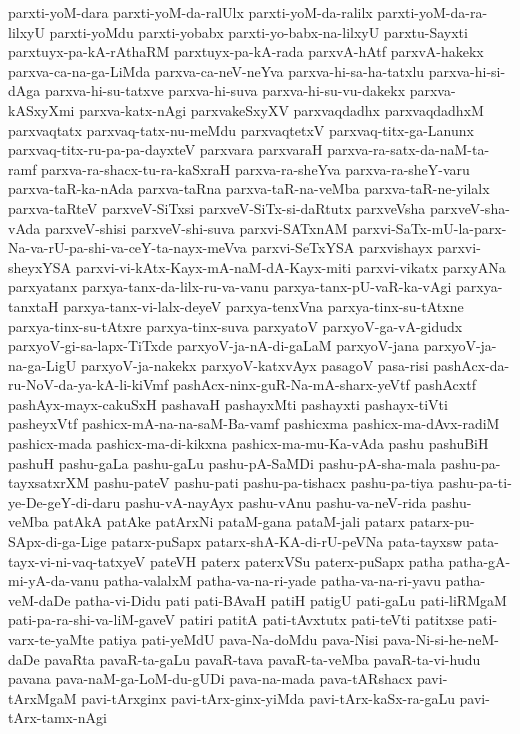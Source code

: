 {parxti-yoM-dara
parxti-yoM-da-ralUlx
parxti-yoM-da-ralilx
parxti-yoM-da-ra-lilxyU
parxti-yoMdu
parxti-yobabx
parxti-yo-babx-na-lilxyU
parxtu-Sayxti
parxtuyx-pa-kA-rAthaRM
parxtuyx-pa-kA-rada
parxvA-hAtf
parxvA-hakekx
parxva-ca-na-ga-LiMda
parxva-ca-neV-neYva
parxva-hi-sa-ha-tatxlu
parxva-hi-si-dAga
parxva-hi-su-tatxve
parxva-hi-suva
parxva-hi-su-vu-dakekx
parxva-kASxyXmi
parxva-katx-nAgi
parxvakeSxyXV
parxvaqdadhx
parxvaqdadhxM
parxvaqtatx
parxvaq-tatx-nu-meMdu
parxvaqtetxV
parxvaq-titx-ga-Lanunx
parxvaq-titx-ru-pa-pa-dayxteV
parxvara
parxvaraH
parxva-ra-satx-da-naM-ta-ramf
parxva-ra-shacx-tu-ra-kaSxraH
parxva-ra-sheYva
parxva-ra-sheY-varu
parxva-taR-ka-nAda
parxva-taRna
parxva-taR-na-veMba
parxva-taR-ne-yilalx
parxva-taRteV
parxveV-SiTxsi
parxveV-SiTx-si-daRtutx
parxveVsha
parxveV-sha-vAda
parxveV-shisi
parxveV-shi-suva
parxvi-SATxnAM
parxvi-SaTx-mU-la-parx-Na-va-rU-pa-shi-va-ceY-ta-nayx-meVva
parxvi-SeTxYSA
parxvishayx
parxvi-sheyxYSA
parxvi-vi-kAtx-Kayx-mA-naM-dA-Kayx-miti
parxvi-vikatx
parxyANa
parxyatanx
parxya-tanx-da-lilx-ru-va-vanu
parxya-tanx-pU-vaR-ka-vAgi
parxya-tanxtaH
parxya-tanx-vi-lalx-deyeV
parxya-tenxVna
parxya-tinx-su-tAtxne
parxya-tinx-su-tAtxre
parxya-tinx-suva
parxyatoV
parxyoV-ga-vA-gidudx
parxyoV-gi-sa-lapx-TiTxde
parxyoV-ja-nA-di-gaLaM
parxyoV-jana
parxyoV-ja-na-ga-LigU
parxyoV-ja-nakekx
parxyoV-katxvAyx
pasagoV
pasa-risi
pashAcx-da-ru-NoV-da-ya-kA-li-kiVmf
pashAcx-ninx-guR-Na-mA-sharx-yeVtf
pashAcxtf
pashAyx-mayx-cakuSxH
pashavaH
pashayxMti
pashayxti
pashayx-tiVti
pasheyxVtf
pashicx-mA-na-na-saM-Ba-vamf
pashicxma
pashicx-ma-dAvx-radiM
pashicx-mada
pashicx-ma-di-kikxna
pashicx-ma-mu-Ka-vAda
pashu
pashuBiH
pashuH
pashu-gaLa
pashu-gaLu
pashu-pA-SaMDi
pashu-pA-sha-mala
pashu-pa-tayxsatxrXM
pashu-pateV
pashu-pati
pashu-pa-tishacx
pashu-pa-tiya
pashu-pa-ti-ye-De-geY-di-daru
pashu-vA-nayAyx
pashu-vAnu
pashu-va-neV-rida
pashu-veMba
patAkA
patAke
patArxNi
pataM-gana
pataM-jali
patarx
patarx-pu-SApx-di-ga-Lige
patarx-puSapx
patarx-shA-KA-di-rU-peVNa
pata-tayxsw
pata-tayx-vi-ni-vaq-tatxyeV
pateVH
paterx
paterxVSu
paterx-puSapx
patha
patha-gA-mi-yA-da-vanu
patha-valalxM
patha-va-na-ri-yade
patha-va-na-ri-yavu
patha-veM-daDe
patha-vi-Didu
pati
pati-BAvaH
patiH
patigU
pati-gaLu
pati-liRMgaM
pati-pa-ra-shi-va-liM-gaveV
patiri
patitA
pati-tAvxtutx
pati-teVti
patitxse
pati-varx-te-yaMte
patiya
pati-yeMdU
pava-Na-doMdu
pava-Nisi
pava-Ni-si-he-neM-daDe
pavaRta
pavaR-ta-gaLu
pavaR-tava
pavaR-ta-veMba
pavaR-ta-vi-hudu
pavana
pava-naM-ga-LoM-du-gUDi
pava-na-mada
pava-tARshacx
pavi-tArxMgaM
pavi-tArxginx
pavi-tArx-ginx-yiMda
pavi-tArx-kaSx-ra-gaLu
pavi-tArx-tamx-nAgi
}

